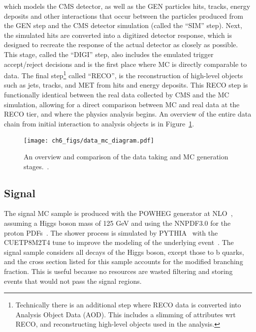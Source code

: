 which models the CMS detector, as well as the GEN particles hits, tracks, energy deposits and other interactions that occur
between the particles produced from the GEN step and the CMS detector simulation (called the ``SIM'' step). Next, the simulated
hits are converted into a digitized detector response, which is designed to recreate the response of the actual detector as
closely as possible. This stage, called the ``DIGI'' step, also includes the emulated trigger accept/reject decisions and is the
first place where MC is directly comparable to data. The final step\footnote{Technically there is an additional step where RECO data
is converted into Analysis Object Data (AOD). This includes a slimming of attributes wrt RECO, and reconstructing high-level objects
used in the analysis.} called ``RECO'', is the reconstruction of high-level objects such as jets, tracks, and MET from hits and
energy deposits. This RECO step is functionally identical between the real data collected by CMS and the MC simulation, allowing
for a direct comparison between MC and real data at the RECO tier, and where the physics analysis begins. An overview of the entire
data chain from initial interaction to analysis objects is in Figure~\ref{fig:data_mc_chain}.

\begin{figure}[hbtp]
 \begin{center}
   \texttt{[image: ch6\_figs/data\_mc\_diagram.pdf]}
   \caption[Diagram comparing data taking and MC generation stages]{An overview and comparison of the data taking and MC generation stages.~\cite{cms_pflow_img}.}
   \label{fig:data_mc_chain}
 \end{center}
\end{figure}

\subsection{Signal}
The signal MC sample is produced with the \textsc{POWHEG} generator at NLO~\cite{powheg}, assuming a Higgs boson mass of 125 GeV and using the \textsc{NNPDF3.0} for the proton
PDFs~\cite{nnpdf3}. The shower process is simulated by \textsc{PYTHIA}~\cite{pythia} with the \textsc{CUETP8M2T4} tune to improve the modeling of the underlying event~\cite{CUETP8M2T4}. 
The signal sample considers all decays of the Higgs boson, except those to b quarks, and the cross section listed for this sample accounts for the modified branching fraction.
This is useful because no resources are wasted filtering and storing events that would not pass the signal regions. 

